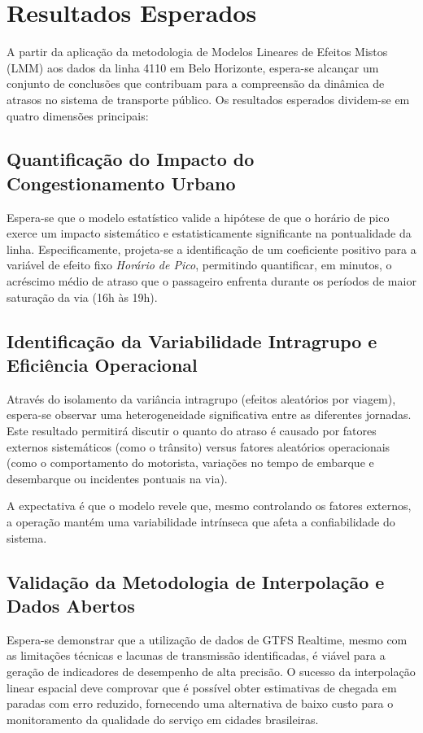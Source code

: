 \section{Resultados Esperados}

A partir da aplicação da metodologia de Modelos Lineares de Efeitos Mistos (LMM) aos dados da linha 4110 em Belo Horizonte, espera-se alcançar um conjunto de conclusões que contribuam para a compreensão da dinâmica de atrasos no sistema de transporte público. Os resultados esperados dividem-se em quatro dimensões principais:

\subsection{Quantificação do Impacto do Congestionamento Urbano}

Espera-se que o modelo estatístico valide a hipótese de que o horário de pico exerce um impacto sistemático e estatisticamente significante na pontualidade da linha. Especificamente, projeta-se a identificação de um coeficiente positivo para a variável de efeito fixo \textit{Horário de Pico}, permitindo quantificar, em minutos, o acréscimo médio de atraso que o passageiro enfrenta durante os períodos de maior saturação da via (16h às 19h).

\subsection{Identificação da Variabilidade Intragrupo e Eficiência Operacional}

Através do isolamento da variância intragrupo (efeitos aleatórios por viagem), espera-se observar uma heterogeneidade significativa entre as diferentes jornadas. Este resultado permitirá discutir o quanto do atraso é causado por fatores externos sistemáticos (como o trânsito) versus fatores aleatórios operacionais (como o comportamento do motorista, variações no tempo de embarque e desembarque ou incidentes pontuais na via).

A expectativa é que o modelo revele que, mesmo controlando os fatores externos, a operação mantém uma variabilidade intrínseca que afeta a confiabilidade do sistema.

\subsection{Validação da Metodologia de Interpolação e Dados Abertos}

Espera-se demonstrar que a utilização de dados de GTFS Realtime, mesmo com as limitações técnicas e lacunas de transmissão identificadas, é viável para a geração de indicadores de desempenho de alta precisão. O sucesso da interpolação linear espacial deve comprovar que é possível obter estimativas de chegada em paradas com erro reduzido, fornecendo uma alternativa de baixo custo para o monitoramento da qualidade do serviço em cidades brasileiras.

